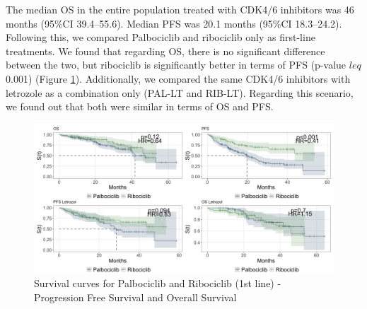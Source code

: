 The median OS in the entire population treated with CDK4/6 inhibitors was 46 months (95\%CI 39.4–55.6). Median PFS was 20.1 months (95\%CI 18.3–24.2). Following this, we compared Palbociclib and ribociclib only as first-line treatments. We found that regarding OS, there is no significant difference between the two, but ribociclib is significantly better in terms of PFS (p-value $leq$ 0.001) (Figure \ref*{fig:interest}). Additionally, we compared the same CDK4/6 inhibitors with letrozole as a combination only (PAL-LT and RIB-LT). Regarding this scenario, we found out that both were similar in terms of OS and PFS.


\begin{figure}[ht]
  \caption{Survival curves for Palbociclib and Ribociclib (1st line) - Progression Free Survival and Overall Survival}\label{fig:interest} 
  \includegraphics[scale=0.45]{figures/interest_curve_both.jpeg}%

\end{figure}


